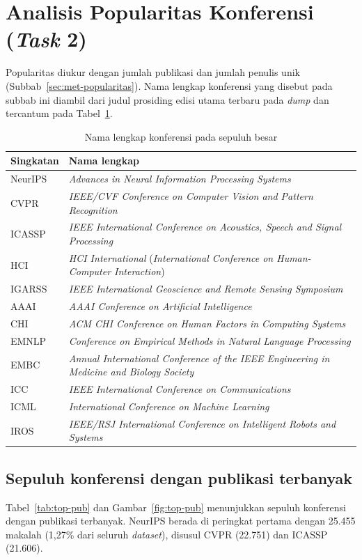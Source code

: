 \section{Analisis Popularitas Konferensi (\textit{Task} 2)}
\label{sec:hasil-t2}
Popularitas diukur dengan jumlah publikasi dan jumlah penulis unik (Subbab~\ref{sec:met-popularitas}). Nama lengkap konferensi yang disebut pada subbab ini diambil dari judul prosiding edisi utama terbaru pada \textit{dump} dan tercantum pada Tabel~\ref{tab:nama}.

\begin{table}[ht]
\caption{Nama lengkap konferensi pada sepuluh besar}
\label{tab:nama}
\small
\begin{tabularx}{\textwidth}{@{}lX@{}}
\toprule
\textbf{Singkatan} & \textbf{Nama lengkap} \\
\midrule
NeurIPS & \textit{Advances in Neural Information Processing Systems} \\
CVPR & \textit{IEEE/CVF Conference on Computer Vision and Pattern Recognition} \\
ICASSP & \textit{IEEE International Conference on Acoustics, Speech and Signal Processing} \\
HCI & \textit{HCI International} (\textit{International Conference on Human-Computer Interaction}) \\
IGARSS & \textit{IEEE International Geoscience and Remote Sensing Symposium} \\
AAAI & \textit{AAAI Conference on Artificial Intelligence} \\
CHI & \textit{ACM CHI Conference on Human Factors in Computing Systems} \\
EMNLP & \textit{Conference on Empirical Methods in Natural Language Processing} \\
EMBC & \textit{Annual International Conference of the IEEE Engineering in Medicine and Biology Society} \\
ICC & \textit{IEEE International Conference on Communications} \\
ICML & \textit{International Conference on Machine Learning} \\
IROS & \textit{IEEE/RSJ International Conference on Intelligent Robots and Systems} \\
\bottomrule
\end{tabularx}
\end{table}

\subsection{Sepuluh konferensi dengan publikasi terbanyak}
\label{sec:hasil-top-pub}
Tabel~\ref{tab:top-pub} dan Gambar~\ref{fig:top-pub} menunjukkan sepuluh konferensi dengan publikasi terbanyak. NeurIPS berada di peringkat pertama dengan 25.455 makalah (1,27\% dari seluruh \textit{dataset}), disusul CVPR (22.751) dan ICASSP (21.606).

